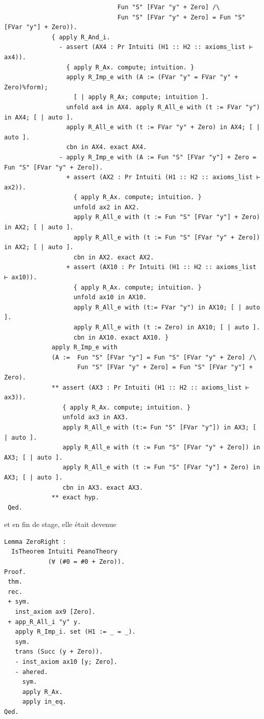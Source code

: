 \documentclass[a4paper]{article}
\theoremstyle{remark}
\theoremstyle{remark}
\theoremstyle{remark}
\theoremstyle{definition}
\theoremstyle{definition}
\theoremstyle{definition}
\begin{document}
\begin{verbatim}
                               Fun "S" [FVar "y" + Zero] /\
                               Fun "S" [FVar "y" + Zero] = Fun "S" [FVar "y"] + Zero)).
             { apply R_And_i.
               - assert (AX4 : Pr Intuiti (H1 :: H2 :: axioms_list ⊢ ax4)).
                 { apply R_Ax. compute; intuition. }
                 apply R_Imp_e with (A := (FVar "y" = FVar "y" + Zero)%form);
                   [ | apply R_Ax; compute; intuition ].
                 unfold ax4 in AX4. apply R_All_e with (t := FVar "y") in AX4; [ | auto ].
                 apply R_All_e with (t := FVar "y" + Zero) in AX4; [ | auto ].
                 cbn in AX4. exact AX4. 
               - apply R_Imp_e with (A := Fun "S" [FVar "y"] + Zero = Fun "S" [FVar "y" + Zero]).
                 + assert (AX2 : Pr Intuiti (H1 :: H2 :: axioms_list ⊢ ax2)).
                   { apply R_Ax. compute; intuition. }
                   unfold ax2 in AX2.
                   apply R_All_e with (t := Fun "S" [FVar "y"] + Zero) in AX2; [ | auto ].
                   apply R_All_e with (t := Fun "S" [FVar "y" + Zero]) in AX2; [ | auto ].
                   cbn in AX2. exact AX2.
                 + assert (AX10 : Pr Intuiti (H1 :: H2 :: axioms_list ⊢ ax10)).
                   { apply R_Ax. compute; intuition. }
                   unfold ax10 in AX10.
                   apply R_All_e with (t:= FVar "y") in AX10; [ | auto ].
                   apply R_All_e with (t := Zero) in AX10; [ | auto ].
                   cbn in AX10. exact AX10. }
             apply R_Imp_e with
             (A :=  Fun "S" [FVar "y"] = Fun "S" [FVar "y" + Zero] /\
                    Fun "S" [FVar "y" + Zero] = Fun "S" [FVar "y"] + Zero).
             ** assert (AX3 : Pr Intuiti (H1 :: H2 :: axioms_list ⊢ ax3)).
                { apply R_Ax. compute; intuition. }
                unfold ax3 in AX3.
                apply R_All_e with (t:= Fun "S" [FVar "y"]) in AX3; [ | auto ].
                apply R_All_e with (t := Fun "S" [FVar "y" + Zero]) in AX3; [ | auto ].
                apply R_All_e with (t := Fun "S" [FVar "y"] + Zero) in AX3; [ | auto ].
                cbn in AX3. exact AX3.
             ** exact hyp.
 Qed.    
\end{verbatim}
et en fin de stage, elle était devenue
\begin{verbatim}
Lemma ZeroRight :
  IsTheorem Intuiti PeanoTheory
            (∀ (#0 = #0 + Zero)).
Proof.
 thm.
 rec.
 + sym.
   inst_axiom ax9 [Zero].
 + app_R_All_i "y" y.
   apply R_Imp_i. set (H1 := _ = _).
   sym.
   trans (Succ (y + Zero)).
   - inst_axiom ax10 [y; Zero].
   - ahered.
     sym.
     apply R_Ax.
     apply in_eq.
Qed.
\end{verbatim}
\end{document}
